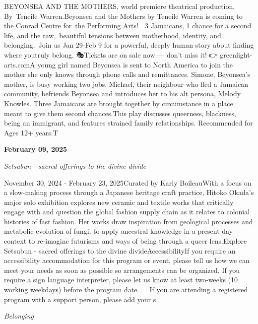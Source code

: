 \documentclass[letterpaper, 10pt]{article}
\newcommand{\headline}[1]{\textbf{\Large #1}\vspace{0.5em}}
\newcommand{\subtitle}[1]{\textit{\large #1}\vspace{0.5em}}
\newcommand{\articlecontent}[1]{\small #1\vspace{1em}}
\begin{document}
\begin{multicols}{2}
{BEYONSEA AND THE MOTHERS, world premiere theatrical production, By Teneile Warren.Beyonsea and the Mothers by Teneile Warren is coming to the Conrad Centre for the Performing Arts! 🥭 3 Jamaicans, 1 chance for a second life, and the raw, beautiful tensions between motherhood, identity, and belonging. Join us Jan 29-Feb 9 for a powerful, deeply human story about finding where youtruly belong. 🎭Tickets are on sale now — don’t miss it! 👉 greenlight-arts.comA young girl named Beyonsea is sent to North America to join the mother she only knows through phone calls and remittances. Simone, Beyonsea’s mother, is busy working two jobs. Michael, their neighbour who fled a Jamaican community, befriends Beyonsea and introduces her to his alt persona, Melody Knowles. Three Jamaicans are brought together by circumstance in a place meant to give them second chances.This play discusses queerness, blackness, being an immigrant, and features strained family relationships. Recommended for Ages 12+ years.T
}
\vspace{10px}

\headline{February 09, 2025}

\subtitle{Setsubun - sacred offerings to the divine divide}

\articlecontent{

\qrcode[height=1.5cm]{https://ideaexchange.libnet.info/event/11297398}
\vspace{10px}

November 30, 2024 - February 23, 2025Curated by Karly BoileauWith a focus on a slow-making process through a Japanese heritage craft practice, Hitoko Okada’s major solo exhibition explores new ceramic and textile works that critically engage with and question the global fashion supply chain as it relates to colonial histories of fast fashion. Her works draw inspiration from geological processes and metabolic evolution of fungi, to apply ancestral knowledge in a present-day context to re-imagine futurisms and ways of being through a queer lens.Explore Setsubun - sacred offerings to the divine divideAccessibilityIf you require an accessibility accommodation for this program or event, please tell us how we can meet your needs as soon as possible so arrangements can be organized. If you require a sign language interpreter, please let us know at least two-weeks (10 working weekdays) before the program date.   If you are attending a registered program with a support person, please add your s
}
\vspace{10px}

\subtitle{Belonging}


\end{multicols}
\end{document}
